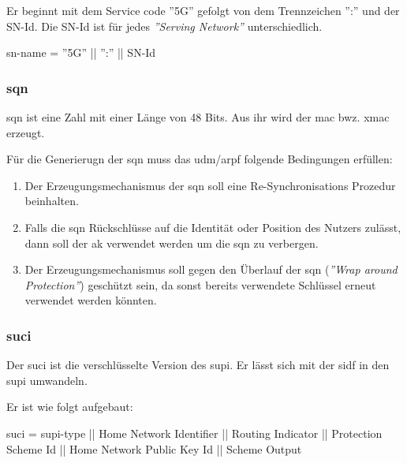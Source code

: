 Er beginnt mit dem Service code ''5G'' gefolgt von dem Trennzeichen '':'' und der SN-Id.
Die SN-Id ist f\"ur jedes \textit{''Serving Network''} unterschiedlich.

\gls{sn-name} = ''5G'' || '':'' || SN-Id

\subsubsection{\gls{sqn}}
\gls{sqn} ist eine Zahl mit einer L\"ange von 48 Bits. %
Aus ihr wird der \gls{mac} bwz. \gls{xmac} erzeugt. %

F\"ur die Generierugn der \gls{sqn} muss das \gls{udm}/\gls{arpf} folgende Bedingungen erf\"ullen:\\%
\begin{enumerate}
\item Der Erzeugungsmechanismus der \gls{sqn} soll eine Re-Synchronisations Prozedur beinhalten.\\
\item Falls die \gls{sqn} R\"uckschl\"usse auf die Identit\"at oder Position des Nutzers zul\"asst, dann soll der \gls{ak} verwendet werden um die \gls{sqn} zu verbergen.\\
\item Der Erzeugungsmechanismus soll gegen den \"Uberlauf der \gls{sqn} (\textit{''Wrap around Protection''}) gesch\"utzt sein, da sonst bereits verwendete Schl\"ussel erneut verwendet werden k\"onnten. 
\end{enumerate}

\subsubsection{\gls{suci}}
Der \gls{suci} ist die verschl\"usselte Version des \gls{supi}.
Er l\"asst sich mit der \gls{sidf} in den \gls{supi} umwandeln.

Er ist wie folgt aufgebaut: %

\gls{suci} = \gls{supi-type} || Home Network Identifier || Routing Indicator || Protection Scheme Id || Home Network Public Key Id || Scheme Output

